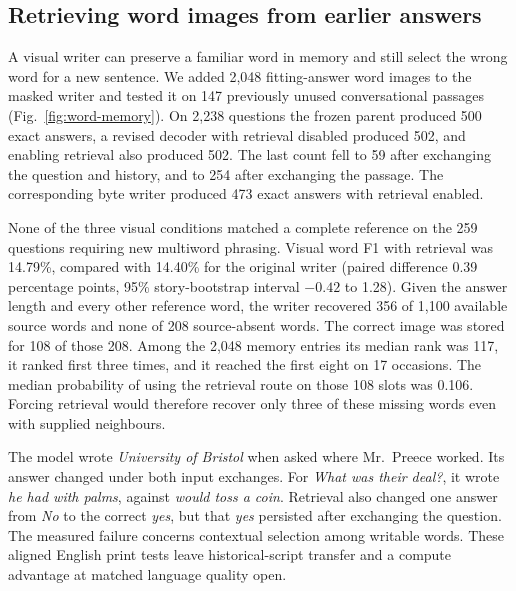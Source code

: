 \documentclass[12pt,a4paper]{article}
\providecommand{\DIFadd}[1]{{\protect\color{blue} \sf #1}} %
\begin{document}
\subsection*{\DIFadd{Retrieving word images from earlier answers}}
\DIFadd{A visual writer can preserve a familiar word in memory and still select the wrong word for a new sentence. We added 2,048 fitting-answer word images to the masked writer and tested it on 147 previously unused conversational passages (Fig.~\ref{fig:word-memory}). On 2,238 questions the frozen parent produced 500 exact answers, a revised decoder with retrieval disabled produced 502, and enabling retrieval also produced 502. The last count fell to 59 after exchanging the question and history, and to 254 after exchanging the passage. The corresponding byte writer produced 473 exact answers with retrieval enabled.
}

\DIFadd{None of the three visual conditions matched a complete reference on the 259 questions requiring new multiword phrasing. Visual word F1 with retrieval was 14.79\%, compared with 14.40\% for the original writer (paired difference 0.39 percentage points, 95\% story-bootstrap interval $-0.42$ to 1.28). Given the answer length and every other reference word, the writer recovered 356 of 1,100 available source words and none of 208 source-absent words. The correct image was stored for 108 of those 208. Among the 2,048 memory entries its median rank was 117, it ranked first three times, and it reached the first eight on 17 occasions. The median probability of using the retrieval route on those 108 slots was 0.106. Forcing retrieval would therefore recover only three of these missing words even with supplied neighbours.
}

\DIFadd{The model wrote \emph{University of Bristol} when asked where Mr.\ Preece worked. Its answer changed under both input exchanges. For \emph{What was their deal?}, it wrote \emph{he had with palms}, against \emph{would toss a coin}. Retrieval also changed one answer from \emph{No} to the correct \emph{yes}, but that \emph{yes} persisted after exchanging the question. The measured failure concerns contextual selection among writable words. These aligned English print tests leave historical-script transfer and a compute advantage at matched language quality open.
}
\end{document}
